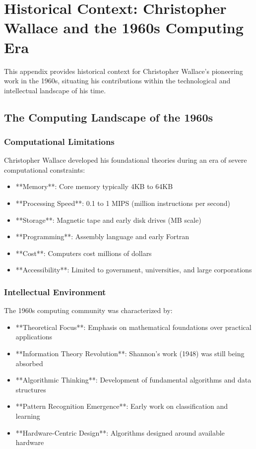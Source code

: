 \section{Historical Context: Christopher Wallace and the 1960s Computing Era}
\label{sec:historical_context}

This appendix provides historical context for Christopher Wallace's pioneering work in the 1960s, situating his contributions within the technological and intellectual landscape of his time.

\subsection{The Computing Landscape of the 1960s}

\subsubsection{Computational Limitations}

Christopher Wallace developed his foundational theories during an era of severe computational constraints:

\begin{itemize}
    \item **Memory**: Core memory typically 4KB to 64KB
    \item **Processing Speed**: 0.1 to 1 MIPS (million instructions per second)
    \item **Storage**: Magnetic tape and early disk drives (MB scale)
    \item **Programming**: Assembly language and early Fortran
    \item **Cost**: Computers cost millions of dollars
    \item **Accessibility**: Limited to government, universities, and large corporations
\end{itemize}

\subsubsection{Intellectual Environment}

The 1960s computing community was characterized by:

\begin{itemize}
    \item **Theoretical Focus**: Emphasis on mathematical foundations over practical applications
    \item **Information Theory Revolution**: Shannon's work (1948) was still being absorbed
    \item **Algorithmic Thinking**: Development of fundamental algorithms and data structures
    \item **Pattern Recognition Emergence**: Early work on classification and learning
    \item **Hardware-Centric Design**: Algorithms designed around available hardware
\end{itemize}

